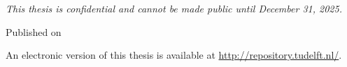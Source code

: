 \begin{titlepage}
\begin{center}
        \bigskip
        \bigskip
        \emph{This thesis is confidential and cannot be made public until December 31, 2025.}

        \bigskip
        \bigskip
        Published on {\makeatletter\ifdefvoid{\@publishDate}{\today}{\@publishDate}\makeatother}

        \bigskip
        \bigskip
        An electronic version of this thesis is available at \url{http://repository.tudelft.nl/}.

    \end{center}


\end{titlepage}
